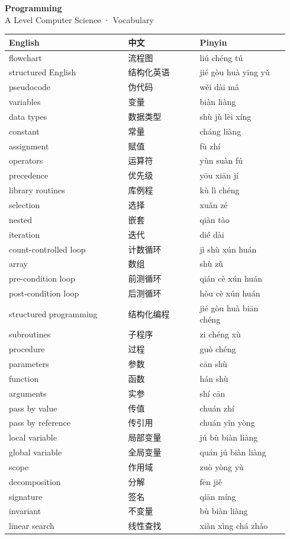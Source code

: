 \documentclass[11pt]{article}
\begin{document}
\begin{center}
  {\LARGE\bfseries Programming}\\[0.35em]
  {\large A Level Computer Science · Vocabulary}
\end{center}
\vspace{0.6em}

\begin{longtable}{@{}p{0.40\linewidth}p{0.24\linewidth}p{0.30\linewidth}@{}}
\toprule
\textbf{English} & \textbf{中文} & \textbf{Pinyin} \\
\midrule
\endhead
\bottomrule
\endlastfoot
flowchart & 流程图 & liú chéng tú \\
structured English & 结构化英语 & jié gòu huà yīng yǔ \\
pseudocode & 伪代码 & wěi dài mǎ \\
variables & 变量 & biàn liàng \\
data types & 数据类型 & shù jù lèi xíng \\
constant & 常量 & cháng liàng \\
assignment & 赋值 & fù zhí \\
operators & 运算符 & yùn suàn fú \\
precedence & 优先级 & yōu xiān jí \\
library routines & 库例程 & kù lì chéng \\
selection & 选择 & xuǎn zé \\
nested & 嵌套 & qiàn tào \\
iteration & 迭代 & dié dài \\
count-controlled loop & 计数循环 & jì shù xún huán \\
array & 数组 & shù zǔ \\
pre-condition loop & 前测循环 & qián cè xún huán \\
post-condition loop & 后测循环 & hòu cè xún huán \\
structured programming & 结构化编程 & jié gòu huà biān chéng \\
subroutines & 子程序 & zi chéng xù \\
procedure & 过程 & guò chéng \\
parameters & 参数 & cān shù \\
function & 函数 & hán shù \\
arguments & 实参 & shí cān \\
pass by value & 传值 & chuán zhí \\
pass by reference & 传引用 & chuán yǐn yòng \\
local variable & 局部变量 & jú bù biàn liàng \\
global variable & 全局变量 & quán jú biàn liàng \\
scope & 作用域 & zuò yòng yù \\
decomposition & 分解 & fēn jiě \\
signature & 签名 & qiān míng \\
invariant & 不变量 & bù biàn liàng \\
linear search & 线性查找 & xiàn xìng chá zhǎo \\
\end{longtable}
\end{document}
